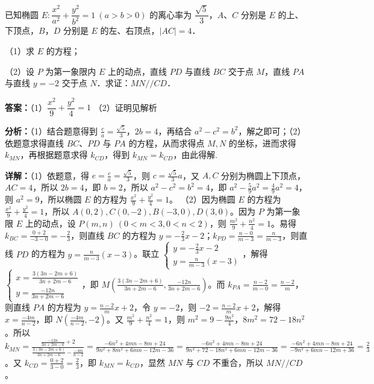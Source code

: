 \begin{question}[points=15]
已知椭圆 $E: \dfrac{x^2}{a^2} + \dfrac{y^2}{b^2} = 1\ (a>b>0)$ 的离心率为 $\dfrac{\sqrt{5}}{3}$，$A$、$C$ 分别是 $E$ 的上、下顶点，$B$，$D$ 分别是 $E$ 的左、右顶点，$|AC|=4$．

（1）求 $E$ 的方程；

（2）设 $P$ 为第一象限内 $E$ 上的动点，直线 $PD$ 与直线 $BC$ 交于点 $M$，直线 $PA$ 与直线 $y=-2$ 交于点 $N$．求证：$MN//CD$．
\begin{solution}
\textbf{答案：}（1）$\dfrac{x^2}{9}+\dfrac{y^2}{4}=1$ （2）证明见解析

\textbf{分析：}（1）结合题意得到 $\frac{c}{a}=\frac{\sqrt{5}}{3}$，$2b=4$，再结合 $a^2-c^2=b^2$，解之即可；（2）依题意求得直线 $BC$、$PD$ 与 $PA$ 的方程，从而求得点 $M,N$ 的坐标，进而求得 $k_{MN}$，再根据题意求得 $k_{CD}$，得到 $k_{MN}=k_{CD}$，由此得解.

\textbf{详解：}（1）依题意，得 $e=\frac{c}{a}=\frac{\sqrt{5}}{3}$，则 $c=\frac{\sqrt{5}}{3}a$，又 $A,C$ 分别为椭圆上下顶点，$AC=4$，所以 $2b=4$，即 $b=2$，所以 $a^2-c^2=b^2=4$，即 $a^2-\frac{5}{9}a^2=\frac{4}{9}a^2=4$，则 $a^2=9$，所以椭圆 $E$ 的方程为 $\frac{x^2}{9}+\frac{y^2}{4}=1$。
（2）因为椭圆 $E$ 的方程为 $\frac{x^2}{9}+\frac{y^2}{4}=1$，所以 $A(0,2), C(0,-2), B(-3,0), D(3,0)$。因为 $P$ 为第一象限 $E$ 上的动点，设 $P(m,n)\ (0<m<3,0<n<2)$，则 $\frac{m^2}{9}+\frac{n^2}{4}=1$。易得 $k_{BC}=\frac{0+2}{-3-0}=-\frac{2}{3}$，则直线 $BC$ 的方程为 $y=-\frac{2}{3}x-2$；$k_{PD}=\frac{n-0}{m-3}=\frac{n}{m-3}$，则直线 $PD$ 的方程为 $y=\frac{n}{m-3}(x-3)$。联立 $\begin{cases} y=-\frac{2}{3}x-2 \\ y=\frac{n}{m-3}(x-3) \end{cases}$，解得 $\begin{cases} x=\frac{3(3n-2m+6)}{3n+2m-6} \\ y=\frac{-12n}{3n+2m-6} \end{cases}$，即 $M\left(\frac{3(3n-2m+6)}{3n+2m-6}, \frac{-12n}{3n+2m-6}\right)$。而 $k_{PA}=\frac{n-2}{m-0}=\frac{n-2}{m}$，则直线 $PA$ 的方程为 $y=\frac{n-2}{m}x+2$，令 $y=-2$，则 $-2=\frac{n-2}{m}x+2$，解得 $x=\frac{-4m}{n-2}$，即 $N\left(\frac{-4m}{n-2},-2\right)$。又 $\frac{m^2}{9}+\frac{n^2}{4}=1$，则 $m^2=9-\frac{9n^2}{4}$，$8m^2=72-18n^2$。所以 $k_{MN}=\frac{\frac{-12n}{3n+2m-6}+2}{\frac{3(3n-2m+6)}{3n+2m-6}-\frac{-4m}{n-2}} = \frac{-6n^2+4mn-8m+24}{9n^2+8m^2+6mn-12m-36} = \frac{-6n^2+4mn-8m+24}{9n^2+72-18n^2+6mn-12m-36} = \frac{-6n^2+4mn-8m+24}{-9n^2+6mn-12m+36} = \frac{2}{3}$。又 $k_{CD}=\frac{0+2}{3-0}=\frac{2}{3}$，即 $k_{MN}=k_{CD}$，显然 $MN$ 与 $CD$ 不重合，所以 $MN//CD$。
\end{solution}
\end{question}

